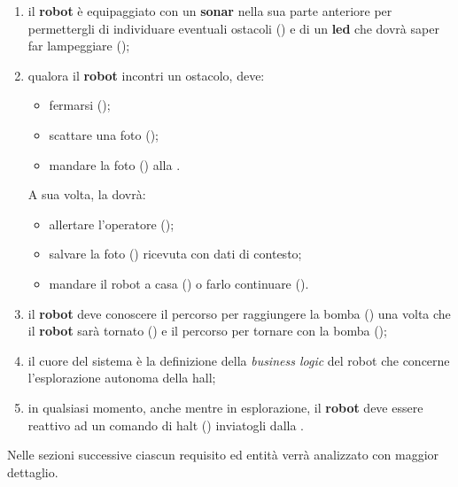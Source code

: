 \begin{enumerate}
  \item
    il \textbf{robot } è equipaggiato con un \textbf{sonar} nella sua parte anteriore per permettergli di individuare eventuali ostacoli () e di un \textbf{led} che dovrà saper far lampeggiare ();

  \item
    qualora il \textbf{robot } incontri un ostacolo, deve:
    \begin{itemize}
      \item fermarsi ();
      \item scattare una foto ();
      \item mandare la foto () alla \textbf{}.
    \end{itemize}
    A sua volta, la \textbf{} dovrà:
    \begin{itemize}
      \item allertare l'operatore ();
      \item salvare la foto () ricevuta con dati di contesto;
      \item mandare il robot a casa () o farlo continuare ().
    \end{itemize}

  \item
    il \textbf{robot } deve conoscere il percorso per raggiungere la bomba () una volta che il \textbf{robot } sarà tornato () e il percorso per tornare con la bomba ();

  \item
    il cuore del sistema è la definizione della \textit{business logic} del robot che concerne l'esplorazione autonoma della hall;

  \item
    in qualsiasi momento, anche mentre in esplorazione, il \textbf{robot } deve essere reattivo ad un comando di halt () inviatogli dalla \textbf{}.
\end{enumerate}

Nelle sezioni successive ciascun requisito ed entità verrà analizzato con maggior dettaglio.

